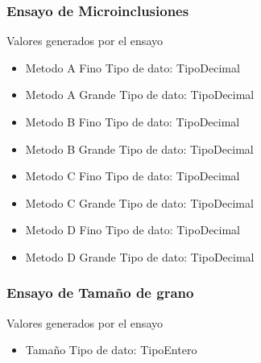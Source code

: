 \documentclass{article}
\begin{document}
\subsubsection{Ensayo de  Microinclusiones}
\par Valores generados por el ensayo
\begin{itemize}
	\item{Metodo A Fino}
		\subitem Tipo de dato: \gls{TipoDecimal}
	\item{Metodo A Grande}
		\subitem Tipo de dato: \gls{TipoDecimal}
	\item{Metodo B Fino}
		\subitem Tipo de dato: \gls{TipoDecimal}
	\item{Metodo B Grande}
		\subitem Tipo de dato: \gls{TipoDecimal}
	\item{Metodo C Fino}
		\subitem Tipo de dato: \gls{TipoDecimal}
	\item{Metodo C Grande}
		\subitem Tipo de dato: \gls{TipoDecimal}
	\item{Metodo D Fino}
		\subitem Tipo de dato: \gls{TipoDecimal}
	\item{Metodo D Grande}
		\subitem Tipo de dato: \gls{TipoDecimal}
\end{itemize}

\subsubsection{Ensayo de Tamaño de grano }
\par Valores generados por el ensayo
\begin{itemize}
	\item{Tamaño}
		\subitem Tipo de dato: \gls{TipoEntero}
\end{itemize}

\newpage
\printglossaries
\end{document}
